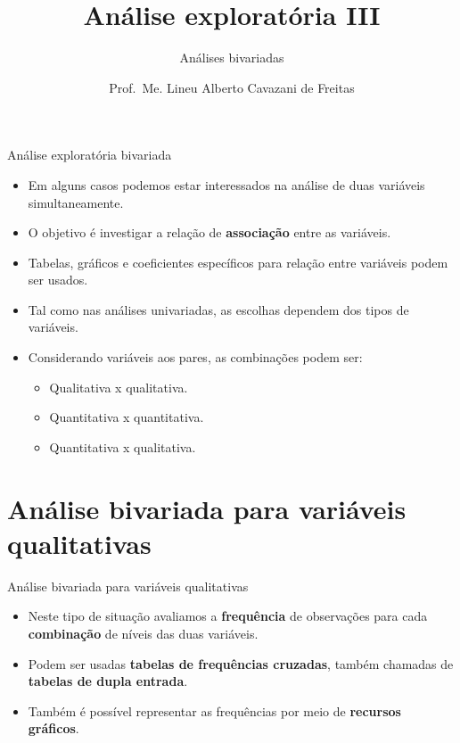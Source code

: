 \documentclass[
  ignorenonframetext,
  serif,
  professionalfont,
  usenames,
  dvipsnames,
  aspectratio = 169]{beamer}
\title{\textbf{Análise exploratória III}}
\subtitle{Análises bivariadas}
\author{Prof.~Me. Lineu Alberto Cavazani de Freitas}
\date{}
\institute{\textbf{CE003 – Estatística II}\\
\strut \\
Departamento de Estatística\\
Laboratório de Estatística e Geoinformação}
\providecommand{\tightlist}{%
  \setlength{\itemsep}{0pt}\setlength{\parskip}{0pt}}
\renewcommand{\tightlist}{%
  \setlength{\itemsep}{0\baselineskip}
  \setlength{\parskip}{0.25\baselineskip}
}
\def\beginAHalfColumn{\begin{minipage}{0.49\textwidth}}%
\def\endColumns{\end{minipage}}%
\begin{document}
\frame{\titlepage}

\begin{frame}{Análise exploratória bivariada}
\protect\hypertarget{anuxe1lise-exploratuxf3ria-bivariada}{}
\beginAHalfColumn

\begin{itemize}
\item
  Em alguns casos podemos estar interessados na análise de duas
  variáveis simultaneamente.
\item
  O objetivo é investigar a relação de \textbf{associação} entre as
  variáveis.
\item
  Tabelas, gráficos e coeficientes específicos para relação entre
  variáveis podem ser usados.
\end{itemize}

\endColumns
\beginAHalfColumn

\begin{itemize}
\item
  Tal como nas análises univariadas, as escolhas dependem dos tipos de
  variáveis.
\item
  Considerando variáveis aos pares, as combinações podem ser:

  \begin{itemize}
  \tightlist
  \item
    Qualitativa x qualitativa.
  \item
    Quantitativa x quantitativa.
  \item
    Quantitativa x qualitativa.
  \end{itemize}
\end{itemize}

\endColumns
\end{frame}

\hypertarget{anuxe1lise-bivariada-para-variuxe1veis-qualitativas}{%
\section{Análise bivariada para variáveis
qualitativas}\label{anuxe1lise-bivariada-para-variuxe1veis-qualitativas}}

\begin{frame}{Análise bivariada para variáveis qualitativas}
\protect\hypertarget{anuxe1lise-bivariada-para-variuxe1veis-qualitativas-1}{}
\begin{itemize}
\item
  Neste tipo de situação avaliamos a \textbf{frequência} de observações
  para cada \textbf{combinação} de níveis das duas variáveis.
\item
  Podem ser usadas \textbf{tabelas de frequências cruzadas}, também
  chamadas de \textbf{tabelas de dupla entrada}.
\item
  Também é possível representar as frequências por meio de
  \textbf{recursos gráficos}.
\end{itemize}
\end{frame}
\end{document}
